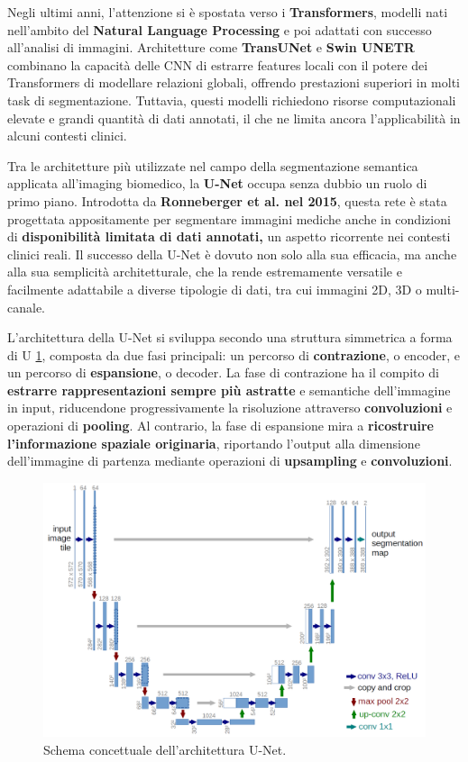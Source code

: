Negli ultimi anni, l’attenzione si è spostata verso i \textbf{Transformers}, modelli nati nell’ambito del \textbf{Natural Language Processing} e poi adattati con successo all’analisi di immagini. Architetture come \textbf{TransUNet} e \textbf{Swin UNETR} combinano la capacità delle CNN di estrarre features locali con il potere dei Transformers di modellare relazioni globali, offrendo prestazioni superiori in molti task di segmentazione. Tuttavia, questi modelli richiedono risorse computazionali elevate e grandi quantità di dati annotati, il che ne limita ancora l’applicabilità in alcuni contesti clinici.



Tra le architetture più utilizzate nel campo della segmentazione semantica applicata all’imaging biomedico, la \textbf{U-Net} occupa senza dubbio un ruolo di primo piano. Introdotta da \textbf{Ronneberger et al. nel 2015}, questa rete è stata progettata appositamente per segmentare immagini mediche anche in condizioni di \textbf{disponibilità limitata di dati annotati,} un aspetto ricorrente nei contesti clinici reali. Il successo della U-Net è dovuto non solo alla sua efficacia, ma anche alla sua semplicità architetturale, che la rende estremamente versatile e facilmente adattabile a diverse tipologie di dati, tra cui immagini 2D, 3D o multi-canale.

L'architettura della U-Net si sviluppa secondo una struttura simmetrica a forma di U \ref{fig:Schema concettuale dell'architettura U-Net}, composta da due fasi principali: un percorso di \textbf{contrazione}, o encoder, e un percorso di \textbf{espansione}, o decoder. La fase di contrazione ha il compito di \textbf{estrarre rappresentazioni sempre più astratte} e semantiche dell’immagine in input, riducendone progressivamente la risoluzione attraverso \textbf{convoluzioni} e operazioni di \textbf{pooling}. Al contrario, la fase di espansione mira a \textbf{ricostruire l’informazione spaziale originaria}, riportando l’output alla dimensione dell’immagine di partenza mediante operazioni di \textbf{upsampling} e \textbf{convoluzioni}.

\begin{figure}[H]
  	\centering 
 	\includegraphics[width=.6\textwidth]{figures/U-Net-architecture.png} 
	 \caption{Schema concettuale dell'architettura U-Net.}
	 \label{fig:Schema concettuale dell'architettura U-Net}
	\end{figure} 

